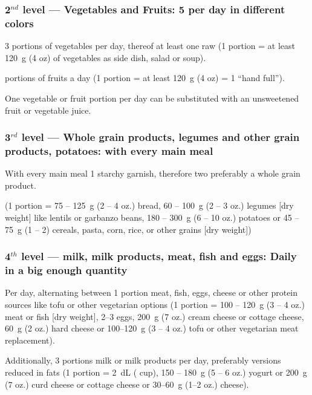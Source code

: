 \documentclass[../main.tex]{subfiles}
\begin{document}
\subsubsection{2$^{nd}$ level --- Vegetables and Fruits: 5 per day in different colors}

3 portions of vegetables per day, thereof at least one raw (1 portion = at least \SI{120}{\gram} (4 oz) of vegetables as side dish, salad or soup).

 portions of fruits a day (1 portion = at least  \SI{120}{\gram} (4 oz) = 1 ``hand full'').

\noindent One vegetable or fruit portion per day can be substituted with an unsweetened fruit or vegetable juice.

\subsubsection{3$^{rd}$ level --- Whole grain products, legumes and other grain products, potatoes: with every main meal}

With every main meal 1 starchy garnish, therefore two preferably a whole grain product.

(1 portion = 75 -- \SI{125}{\gram} (2 -- 4 oz.) bread,
60 -- \SI{100}{\gram} (2 -- 3 oz.) legumes [dry weight] like lentils or garbanzo beans,
180 -- \SI{300}{\gram} (6 -- 10 oz.) potatoes
or  45 -- \SI{75}{\gram} (1 -- 2) cereals, pasta, corn, rice, or other grains [dry weight])

\subsubsection{4$^{th}$ level --- milk, milk products, meat, fish and eggs: Daily in a big enough quantity}

Per day, alternating between 1 portion meat, fish, eggs, cheese or other protein sources like tofu or other vegetarian options
(1 portion = 100 -- \SI{120}{\gram} (3 -- 4 oz.) meat or fish [dry weight],
2--3 eggs, \SI{200}{\gram} (7 oz.) cream cheese or cottage cheese,
\SI{60}{\gram} (2 oz.) hard cheese
or 100--\SI{120}{\gram} (3 -- 4 oz.) tofu or other vegetarian meat replacement).

\noindent Additionally, 3 portions milk or milk products per day, preferably versions reduced in fats
(1 portion = \SI{2}{\deci\liter} ( cup), 150 -- \SI{180}{\gram} (5 -- 6 oz.) yogurt
or \SI{200}{\gram} (7 oz.) curd cheese or cottage cheese or 30--\SI{60}{\gram} (1--2 oz.) cheese).
\end{document}
